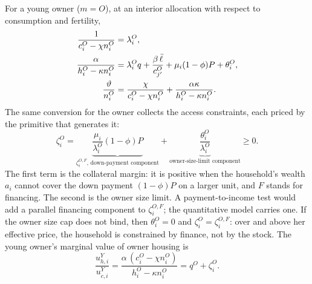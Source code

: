 \documentclass[11pt]{article}
\newcommand{\1}{\mathbf 1}
\begin{document}
For a young owner ($m=O$), at an interior allocation with respect to consumption and fertility,
\begin{align}
\frac{1}{c_i^O-\chi n_i^O}&=\lambda_i^O,
\notag\\
\frac{\alpha}{h_i^O-\kappa n_i^O}
&=
\lambda_i^O q+
\frac{\beta\,\bar\ell}{c_{j'}^O}+
\mu_i(1-\phi)P+
\theta_i^O,
\notag\\
\frac{\vartheta}{n_i^O}
&=
\frac{\chi}{c_i^O-\chi n_i^O}+\frac{\alpha\kappa}{h_i^O-\kappa n_i^O}.
\label{eq:compact_owner_foc_n}
\end{align}
The same conversion for the owner collects the access constraints, each priced by the primitive that generates it:
\[
\zeta_i^O
=
\underbrace{\frac{\mu_i}{\lambda_i^O}(1-\phi)P}_{\zeta_i^{O,F}\text{, down-payment component}}
+
\underbrace{\frac{\theta_i^O}{\lambda_i^O}}_{\text{owner-size-limit component}}
\ge0.
\]
The first term is the collateral margin: it is positive when the household's wealth $a_i$ cannot cover the down payment $(1-\phi)P$ on a larger unit, and $F$ stands for financing. The second is the owner size limit. A payment-to-income test would add a parallel financing component to $\zeta_i^{O,F}$; the quantitative model carries one. If the owner size cap does not bind, then $\theta_i^O=0$ and $\zeta_i^O=\zeta_i^{O,F}$: over and above her effective price, the household is constrained by finance, not by the stock. The young owner's marginal value of owner housing is
\begin{equation}
\frac{u^Y_{h,i}}{u^Y_{c,i}}
=
\frac{\alpha\,(c_i^O-\chi n_i^O)}{h_i^O-\kappa n_i^O}
=
q^O+\zeta_i^O.
\label{eq:compact_owner_mv}
\end{equation}
\end{document}
